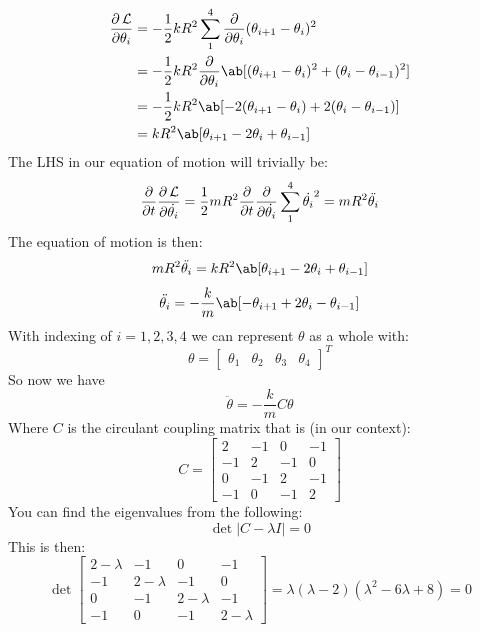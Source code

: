 \begin{align}
    \pdv{\Lagr}{\theta_i} &= -\frac{1}{2}kR^2 \sum_{1}^{4} \pdv{}{\theta_i}(\theta_{i+1} - \theta_i)^2 \\ 
    &= -\frac{1}{2}kR^2 \pdv{}{\theta_i}\ab[(\theta_{i+1}-\theta_i)^2 + (\theta_i - \theta_{i-1})^2] \\
    &= -\frac{1}{2}kR^2 \ab[-2(\theta_{i+1}-\theta_i) + 2(\theta_i - \theta_{i-1})]\\
    &= kR^2 \ab[\theta_{i+1} - 2\theta_i + \theta_{i-1}]
\end{align}
The LHS in our equation of motion will trivially be:
\begin{equation}
    \pdv{}{t}\pdv{\operatorname{\mathcal{L}}}{\dot{\theta_i}} = \frac{1}{2}mR^2\pdv{}{t}\pdv{}{\dot{\theta_i}}\sum_{1}^{4}\dot{\theta_i}^2 = mR^2 \ddot{\theta_i}
\end{equation}
The equation of motion is then:
\begin{equation}
    mR^2\ddot{\theta_i} = kR^2 \ab[\theta_{i+1} - 2\theta_i + \theta_{i-1}]
\end{equation}
\begin{equation}
    \ddot{\theta_i} = -\frac{k}{m}\ab[-\theta_{i+1} + 2\theta_i - \theta_{i-1}]
\end{equation}
With indexing of $i = 1,2,3,4$ we can represent $\theta$ as a whole with:
\begin{equation}
    \theta = \begin{bmatrix}
        \theta_1 & \theta_2 & \theta_3 & \theta_4
    \end{bmatrix}^T
\end{equation}
So now we have 
\begin{equation}
    \ddot{\theta} = -\frac{k}{m}C \theta
\end{equation}
Where $C$ is the circulant coupling matrix that is (in our context):
\begin{equation}
    C = \begin{bmatrix}
        2 & -1 & 0 & -1 \\
        -1 & 2 & -1 & 0 \\
        0 & -1 & 2 & -1 \\
        -1 & 0 & -1 & 2
    \end{bmatrix}
\end{equation}
You can find the eigenvalues from the following:
\begin{equation}
    \det |C - \lambda I| = 0
\end{equation}
This is then:
\begin{equation}
    \det \begin{bmatrix}
        2-\lambda & -1 & 0 & -1 \\
        -1 & 2 - \lambda & -1 & 0 \\
        0 & -1 & 2 -\lambda & -1 \\
        -1 & 0 & -1 & 2 -\lambda
    \end{bmatrix}
    = \lambda(\lambda - 2)(\lambda^2-6\lambda+8) = 0    
\end{equation}
